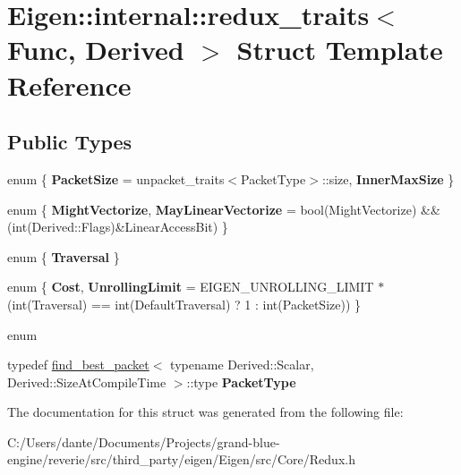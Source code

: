 \hypertarget{struct_eigen_1_1internal_1_1redux__traits}{}\section{Eigen\+::internal\+::redux\+\_\+traits$<$ Func, Derived $>$ Struct Template Reference}
\label{struct_eigen_1_1internal_1_1redux__traits}
\subsection*{Public Types}
\begin{DoxyCompactItemize}
\item 
\mbox{\label{struct_eigen_1_1internal_1_1redux__traits_a5574435d9ae4e44820446f7cb25b6813}} 
enum \{ {\bfseries Packet\+Size} = unpacket\+\_\+traits$<$Packet\+Type$>$\+::size, 
{\bfseries Inner\+Max\+Size}
 \}
\item 
\mbox{\label{struct_eigen_1_1internal_1_1redux__traits_aa057a8f880a9cfec24992424b5cde4db}} 
enum \{ {\bfseries Might\+Vectorize}, 
{\bfseries May\+Linear\+Vectorize} = bool(Might\+Vectorize) \&\& (int(Derived\+::Flags)\&Linear\+Access\+Bit)
 \}
\item 
\mbox{\label{struct_eigen_1_1internal_1_1redux__traits_ad37bc9c057a1f971bac9982512f1a6eb}} 
enum \{ {\bfseries Traversal}
 \}
\item 
\mbox{\label{struct_eigen_1_1internal_1_1redux__traits_abab40bf750ea33c0a6e0d697759dd86b}} 
enum \{ {\bfseries Cost}, 
{\bfseries Unrolling\+Limit} = E\+I\+G\+E\+N\+\_\+\+U\+N\+R\+O\+L\+L\+I\+N\+G\+\_\+\+L\+I\+M\+IT $\ast$ (int(Traversal) == int(Default\+Traversal) ? 1 \+: int(Packet\+Size))
 \}
\item 
\mbox{\label{struct_eigen_1_1internal_1_1redux__traits_a2244fbc9a06b3381a66544b870028341}} 
enum 
\item 
\mbox{\label{struct_eigen_1_1internal_1_1redux__traits_a575f9776864cca5fe374369e42237c90}} 
typedef \mbox{\hyperlink{struct_eigen_1_1internal_1_1find__best__packet}{find\+\_\+best\+\_\+packet}}$<$ typename Derived\+::\+Scalar, Derived\+::\+Size\+At\+Compile\+Time $>$\+::type {\bfseries Packet\+Type}
\end{DoxyCompactItemize}


The documentation for this struct was generated from the following file\+:\begin{DoxyCompactItemize}
\item 
C\+:/\+Users/dante/\+Documents/\+Projects/grand-\/blue-\/engine/reverie/src/third\+\_\+party/eigen/\+Eigen/src/\+Core/Redux.\+h\end{DoxyCompactItemize}
